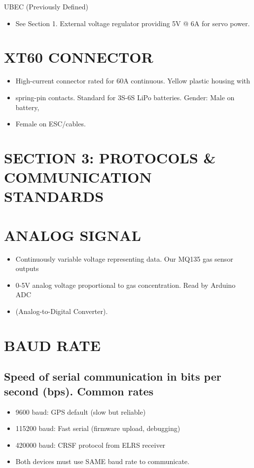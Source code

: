 \documentclass[11pt,letterpaper]{article}
\begin{document}
UBEC (Previously Defined)\par

\begin{itemize}
  \item See Section 1. External voltage regulator providing 5V @ 6A for servo power.
\end{itemize}

\section{XT60 CONNECTOR}

\begin{itemize}
  \item High-current connector rated for 60A continuous. Yellow plastic housing with
  \item spring-pin contacts. Standard for 3S-6S LiPo batteries. Gender: Male on battery,
  \item Female on ESC/cables.
\end{itemize}

\section{SECTION 3: PROTOCOLS \& COMMUNICATION STANDARDS}

\section{ANALOG SIGNAL}

\begin{itemize}
  \item Continuously variable voltage representing data. Our MQ135 gas sensor outputs
  \item 0-5V analog voltage proportional to gas concentration. Read by Arduino ADC
  \item (Analog-to-Digital Converter).
\end{itemize}

\section{BAUD RATE}

\subsection{Speed of serial communication in bits per second (bps). Common rates}

\begin{itemize}
  \item 9600 baud: GPS default (slow but reliable)
  \item 115200 baud: Fast serial (firmware upload, debugging)
  \item 420000 baud: CRSF protocol from ELRS receiver
  \item Both devices must use SAME baud rate to communicate.
\end{itemize}
\end{document}
